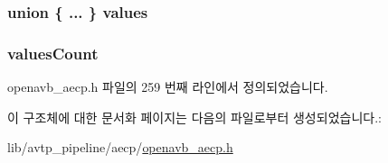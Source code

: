 \subsubsection[{\texorpdfstring{values}{values}}]{\setlength{\rightskip}{0pt plus 5cm}union \{ ... \}   values}\hypertarget{structopenavb__aecp__commandresponse__data__set__control__t_a7b56a329473e9e0c055e1940df0767a6}{}\label{structopenavb__aecp__commandresponse__data__set__control__t_a7b56a329473e9e0c055e1940df0767a6}
\subsubsection[{\texorpdfstring{values\+Count}{valuesCount}}]{ values\+Count}\hypertarget{structopenavb__aecp__commandresponse__data__set__control__t_a264345a5327a88764d6dc9b6ad3abc1f}{}\label{structopenavb__aecp__commandresponse__data__set__control__t_a264345a5327a88764d6dc9b6ad3abc1f}


openavb\+\_\+aecp.\+h 파일의 259 번째 라인에서 정의되었습니다.



이 구조체에 대한 문서화 페이지는 다음의 파일로부터 생성되었습니다.\+:\begin{DoxyCompactItemize}
\item 
lib/avtp\+\_\+pipeline/aecp/\hyperlink{openavb__aecp_8h}{openavb\+\_\+aecp.\+h}\end{DoxyCompactItemize}
